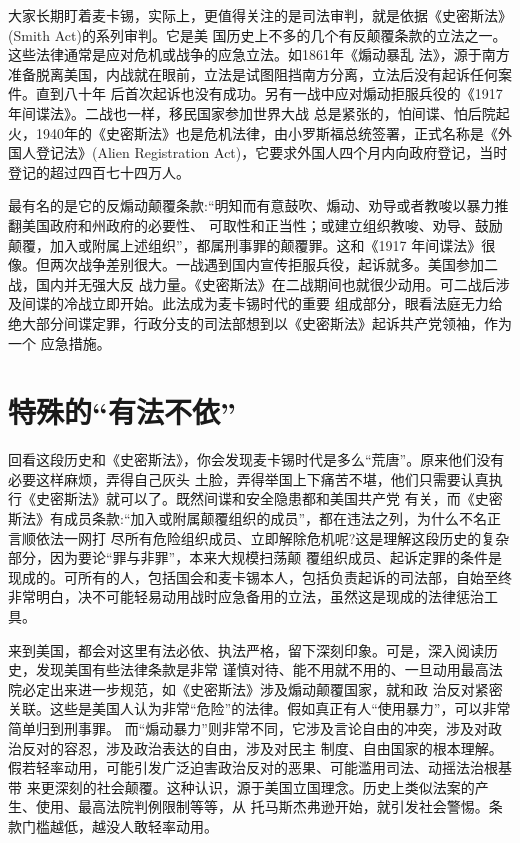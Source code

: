 \documentclass[10pt]{article}
\begin{document}
{大家长期盯着麦卡锡，实际上，更值得关注的是司法审判，就是依据《史密斯法》(Smith Act)的系列审判。它是美
国历史上不多的几个有反颠覆条款的立法之一。这些法律通常是应对危机或战争的应急立法。如1861年《煽动暴乱
法》，源于南方准备脱离美国，内战就在眼前，立法是试图阻挡南方分离，立法后没有起诉任何案件。直到八十年
后首次起诉也没有成功。另有一战中应对煽动拒服兵役的《1917年间谍法》。二战也一样，移民国家参加世界大战
总是紧张的，怕间谍、怕后院起火，1940年的《史密斯法》也是危机法律，由小罗斯福总统签署，正式名称是《外
国人登记法》(Alien Registration Act)，它要求外国人四个月内向政府登记，当时登记的超过四百七十四万人。

最有名的是它的反煽动颠覆条款:``明知而有意鼓吹、煽动、劝导或者教唆以暴力推翻美国政府和州政府的必要性、
可取性和正当性；或建立组织教唆、劝导、鼓励颠覆，加入或附属上述组织''，都属刑事罪的颠覆罪。这和《1917
年间谍法》很像。但两次战争差别很大。一战遇到国内宣传拒服兵役，起诉就多。美国参加二战，国内并无强大反
战力量。《史密斯法》在二战期间也就很少动用。可二战后涉及间谍的冷战立即开始。此法成为麦卡锡时代的重要
组成部分，眼看法庭无力给绝大部分间谍定罪，行政分支的司法部想到以《史密斯法》起诉共产党领袖，作为一个
应急措施。


\pagebreak
\section{特殊的``有法不依''}

回看这段历史和《史密斯法》，你会发现麦卡锡时代是多么``荒唐''。原来他们没有必要这样麻烦，弄得自己灰头
土脸，弄得举国上下痛苦不堪，他们只需要认真执行《史密斯法》就可以了。既然间谍和安全隐患都和美国共产党
有关，而《史密斯法》有成员条款:``加入或附属颠覆组织的成员''，都在违法之列，为什么不名正言顺依法一网打
尽所有危险组织成员、立即解除危机呢?这是理解这段历史的复杂部分，因为要论``罪与非罪''，本来大规模扫荡颠
覆组织成员、起诉定罪的条件是现成的。可所有的人，包括国会和麦卡锡本人，包括负责起诉的司法部，自始至终
非常明白，决不可能轻易动用战时应急备用的立法，虽然这是现成的法律惩治工具。

来到美国，都会对这里有法必依、执法严格，留下深刻印象。可是，深入阅读历史，发现美国有些法律条款是非常
谨慎对待、能不用就不用的、一旦动用最高法院必定出来进一步规范，如《史密斯法》涉及煽动颠覆国家，就和政
治反对紧密关联。这些是美国人认为非常``危险''的法律。假如真正有人``使用暴力''，可以非常简单归到刑事罪。
而``煽动暴力''则非常不同，它涉及言论自由的冲突，涉及对政治反对的容忍，涉及政治表达的自由，涉及对民主
制度、自由国家的根本理解。假若轻率动用，可能引发广泛迫害政治反对的恶果、可能滥用司法、动摇法治根基带
来更深刻的社会颠覆。这种认识，源于美国立国理念。历史上类似法案的产生、使用、最高法院判例限制等等，从
托马斯\textperiodcentered 杰弗逊开始，就引发社会警惕。条款门槛越低，越没人敢轻率动用。

}
\end{document}
